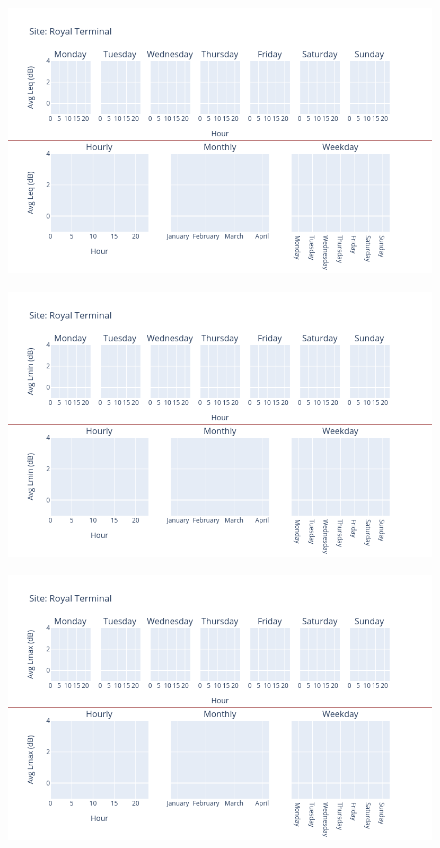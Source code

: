 \documentclass[12pt, oneside]{book}
\begin{document}
{ 
{\begin{figure}[H] 
 \centering 
\includegraphics[width=.88\textwidth, keepaspectratio]{image143} 
 \end{figure}}{} 

{\begin{figure}[H] 
 \centering 
\includegraphics[width=.88\textwidth, keepaspectratio]{image144} 
 \end{figure}}{} 

{\begin{figure}[H] 
 \centering 
\includegraphics[width=.88\textwidth, keepaspectratio]{image145} 
 \end{figure}}{} 

}
\end{document}
